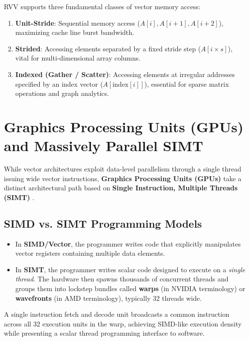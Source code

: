 RVV supports three fundamental classes of vector memory access:
\begin{enumerate}
    \item \textbf{Unit-Stride}: Sequential memory access ($A[i], A[i+1], A[i+2]$), maximizing cache line burst bandwidth.
    \item \textbf{Strided}: Accessing elements separated by a fixed stride step ($A[i \times s]$), vital for multi-dimensional array columns.
    \item \textbf{Indexed (Gather / Scatter)}: Accessing elements at irregular addresses specified by an index vector ($A[\text{index}[i]]$), essential for sparse matrix operations and graph analytics.
\end{enumerate}


\section{Graphics Processing Units (GPUs) and Massively Parallel SIMT}\label{sec:gpu_simt}

While vector architectures exploit data-level parallelism through a single thread issuing wide vector instructions, \textbf{Graphics Processing Units (GPUs)} take a distinct architectural path based on \textbf{Single Instruction, Multiple Threads (SIMT)} \cite{owens2008gpu}.

\subsection{SIMD vs. SIMT Programming Models}
\begin{itemize}
    \item In \textbf{SIMD/Vector}, the programmer writes code that explicitly manipulates vector registers containing multiple data elements.
    \item In \textbf{SIMT}, the programmer writes scalar code designed to execute on a \emph{single thread}. The hardware then spawns thousands of concurrent threads and groups them into lockstep bundles called \textbf{warps} (in NVIDIA terminology) or \textbf{wavefronts} (in AMD terminology), typically 32 threads wide.
\end{itemize}
A single instruction fetch and decode unit broadcasts a common instruction across all 32 execution units in the warp, achieving SIMD-like execution density while presenting a scalar thread programming interface to software.

